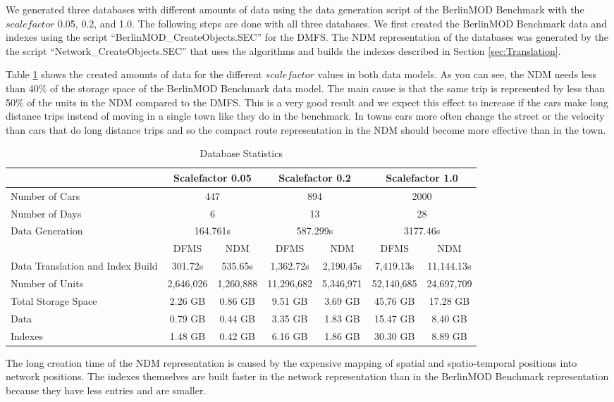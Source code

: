\documentclass[a4paper]{article}
\newcommand{\bmodb} {BerlinMOD Benchmark}
\begin{document}
We generated three databases with different amounts of data using the data generation
script of the \bmodb{} with the $scalefactor$ 0.05, 0.2, and 1.0. The following
steps are done with all three databases. We first created the \bmodb{} data and indexes
using the script ``BerlinMOD\_CreateObjects.SEC'' for the DMFS. The NDM
representation of the databases was generated by the the script ``Network\_CreateObjects.SEC''
that uses the algorithms and builds the indexes described in Section \ref{sec:Translation}.

Table \ref{tab:dbstat} shows the created amounts of data for the different $scalefactor$
values in both data models. As you can see, the NDM needs less
than 40\% of the storage space of the \bmodb{} data model. The main cause is that
the same trip is represented by less than 50\% of the units in the NDM
compared to the DMFS. This is a very good result and we expect this effect to
increase if the cars make long distance
trips instead of moving in a single town like they do in the benchmark. In towns
cars more often change the street or the velocity than cars that do long distance
trips and so the compact route representation in the NDM should become
more effective than in the town.
\begin{table}[H]
\begin{center}
\begin{scriptsize}
\begin{tabularx}{1.0\textwidth}{|X|c|c|c|c|c|c|}
\hline
&\multicolumn{2}{c|}{\textbf{Scalefactor 0.05}}&\multicolumn{2}{c|}{\textbf{Scalefactor 0.2}}&\multicolumn{2}{c|}{\textbf{Scalefactor 1.0}}\\
\hline
Number of Cars&\multicolumn{2}{c|}{447}&\multicolumn{2}{c|}{894}&\multicolumn{2}{c|}{2000}\\
\hline
Number of Days&\multicolumn{2}{c|}{6}&\multicolumn{2}{c|}{13}&\multicolumn{2}{c|}{28}\\
\hline
Data Generation&\multicolumn{2}{c|}{164.761s}&\multicolumn{2}{c|}{587.299s}&\multicolumn{2}{c|}{3177.46s}\\
\hline
&DFMS&NDM&DFMS&NDM&DFMS&NDM\\
\hline
Data Translation
and Index Build&301.72s&535.65s&1,362.72s&2,190.45s&7,419.13s&11,144.13s\\
\hline
Number of Units&2,646,026&1,260,888&11,296,682&5,346,971&52,140,685&24,697,709\\
\hline
Total Storage Space&2.26 GB&0.86 GB&9.51 GB&3.69 GB&45,76 GB&17.28 GB\\
Data&0.79 GB&0.44 GB&3.35 GB&1.83 GB&15.47 GB& 8.40 GB\\
Indexes&1.48 GB&0.42 GB&6.16 GB&1.86 GB&30.30 GB&8.89 GB\\
\hline
\end{tabularx}
\end{scriptsize}
\caption{Database Statistics}
\label{tab:dbstat}
\end{center}
\end{table}
The long creation time of the NDM representation is
caused by the expensive mapping of spatial and spatio-temporal positions into
network positions. The indexes themselves are built faster in the network representation
than in the \bmodb{} representation because they have less entries and are smaller.
\end{document}
